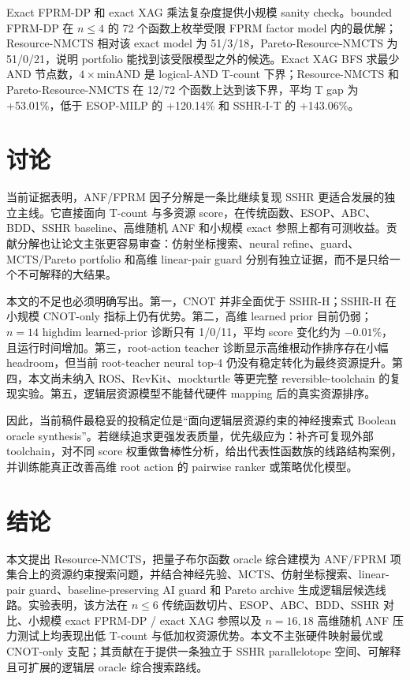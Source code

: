 \documentclass[UTF8,fontset=macnew,11pt]{ctexart}
\newcommand{\method}{Resource-NMCTS}
\newcommand{\pareto}{Pareto-Resource-NMCTS}
\begin{document}
Exact FPRM-DP 和 exact XAG 乘法复杂度提供小规模 sanity check。bounded FPRM-DP 在 $n\leq4$ 的 72 个函数上枚举受限 FPRM factor model 内的最优解；\method{} 相对该 exact model 为 51/3/18，\pareto{} 为 51/0/21，说明 portfolio 能找到该受限模型之外的候选。Exact XAG BFS 求最少 AND 节点数，$4\times\mathrm{minAND}$ 是 logical-AND T-count 下界；\method{} 和 \pareto{} 在 12/72 个函数上达到该下界，平均 T gap 为 +53.01\%，低于 ESOP-MILP 的 +120.14\% 和 SSHR-I-T 的 +143.06\%。

\section{讨论}

当前证据表明，ANF/FPRM 因子分解是一条比继续复现 SSHR 更适合发展的独立主线。它直接面向 T-count 与多资源 score，在传统函数、ESOP、ABC、BDD、SSHR baseline、高维随机 ANF 和小规模 exact 参照上都有可测收益。贡献分解也让论文主张更容易审查：仿射坐标搜索、neural refine、guard、MCTS/Pareto portfolio 和高维 linear-pair guard 分别有独立证据，而不是只给一个不可解释的大结果。

本文的不足也必须明确写出。第一，CNOT 并非全面优于 SSHR-H；SSHR-H 在小规模 CNOT-only 指标上仍有优势。第二，高维 learned prior 目前仍弱；$n=14$ highdim learned-prior 诊断只有 1/0/11，平均 score 变化约为 $-0.01\%$，且运行时间增加。第三，root-action teacher 诊断显示高维根动作排序存在小幅 headroom，但当前 root-teacher neural top-4 仍没有稳定转化为最终资源提升。第四，本文尚未纳入 ROS、RevKit、mockturtle 等更完整 reversible-toolchain 的复现实验。第五，逻辑层资源模型不能替代硬件 mapping 后的真实资源排序。

因此，当前稿件最稳妥的投稿定位是“面向逻辑层资源约束的神经搜索式 Boolean oracle synthesis”。若继续追求更强发表质量，优先级应为：补齐可复现外部 toolchain，对不同 score 权重做鲁棒性分析，给出代表性函数族的线路结构案例，并训练能真正改善高维 root action 的 pairwise ranker 或策略优化模型。

\section{结论}

本文提出 \method{}，把量子布尔函数 oracle 综合建模为 ANF/FPRM 项集合上的资源约束搜索问题，并结合神经先验、MCTS、仿射坐标搜索、linear-pair guard、baseline-preserving AI guard 和 Pareto archive 生成逻辑层候选线路。实验表明，该方法在 $n\leq6$ 传统函数切片、ESOP、ABC、BDD、SSHR 对比、小规模 exact FPRM-DP / exact XAG 参照以及 $n=16,18$ 高维随机 ANF 压力测试上均表现出低 T-count 与低加权资源优势。本文不主张硬件映射最优或 CNOT-only 支配；其贡献在于提供一条独立于 SSHR parallelotope 空间、可解释且可扩展的逻辑层 oracle 综合搜索路线。
\end{document}
